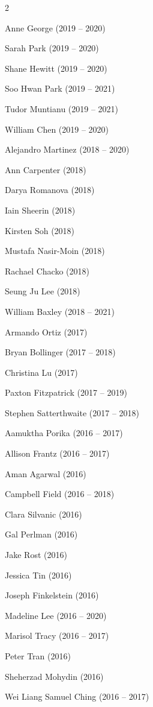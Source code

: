 \documentclass{tufte-book} %
\begin{document}
\begin{fullwidth}
\begin{multicols}{2}
\begin{list}{\quad}{}
\item Anne George (2019 -- 2020)
\item Sarah Park (2019 -- 2020)
\item Shane Hewitt (2019 -- 2020)
\item Soo Hwan Park (2019 -- 2021)
\item Tudor Muntianu (2019 -- 2021)
\item William Chen (2019 -- 2020)
\item Alejandro Martinez (2018 -- 2020)
\item Ann Carpenter (2018)
\item Darya Romanova (2018)
\item Iain Sheerin (2018)
\item Kirsten Soh (2018)
\item Mustafa Nasir-Moin (2018)
\item Rachael Chacko (2018)
\item Seung Ju Lee (2018)
\item William Baxley (2018 -- 2021)
\item Armando Ortiz (2017)
\item Bryan Bollinger (2017 -- 2018)
\item Christina Lu (2017)
\item Paxton Fitzpatrick (2017 -- 2019)
\item Stephen Satterthwaite (2017 -- 2018)
\item Aamuktha Porika (2016 -- 2017)
\item Allison Frantz (2016 -- 2017)
\item Aman Agarwal (2016)
\item Campbell Field (2016 -- 2018)
\item Clara Silvanic (2016)
\item Gal Perlman (2016)
\item Jake Rost (2016)
\item Jessica Tin (2016)
\item Joseph Finkelstein (2016)
\item Madeline Lee (2016 -- 2020)
\item Marisol Tracy (2016 -- 2017)
\item Peter Tran (2016)
\item Sheherzad Mohydin (2016)
\item Wei Liang Samuel Ching (2016 -- 2017)
\end{list}
\end{multicols}
\end{fullwidth}
\end{document}
